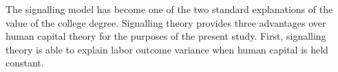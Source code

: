 \documentclass[review]{elsarticle}
\begin{document}




The signalling model has become one of the two standard explanations of the value of the college degree.
Signalling theory provides three advantages over human capital theory for the purposes of the present study.
First, signalling theory is able to explain labor outcome variance when human capital is held constant.
\end{document}

